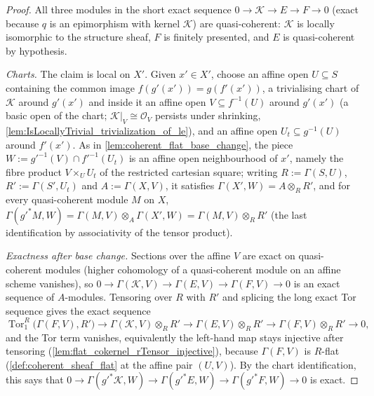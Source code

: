 \begin{proof}
  \leanok
  All three modules in the short exact sequence
  \(0 \to \mathcal K \to E \to F \to 0\) (exact because \(q\) is an
  epimorphism with kernel \(\mathcal K\)) are quasi-coherent: \(\mathcal K\)
  is locally isomorphic to the structure sheaf, \(F\) is finitely presented,
  and \(E\) is quasi-coherent by hypothesis.

  \emph{Charts.}  The claim is local on \(X'\).  Given \(x' \in X'\), choose
  an affine open \(U \subseteq S\) containing the common image
  \(f(g'(x')) = g(f'(x'))\), a trivialising chart of \(\mathcal K\) around
  \(g'(x')\) and inside it an affine open \(V \subseteq f^{-1}(U)\) around
  \(g'(x')\) (a basic open of the chart; \(\mathcal K|_V \cong \mathcal
  O_V\) persists under shrinking,
  \cref{lem:IsLocallyTrivial_trivialization_of_le}), and an affine open
  \(U_t \subseteq g^{-1}(U)\) around \(f'(x')\).  As in
  \cref{lem:coherent_flat_base_change}, the piece
  \(W := g'^{-1}(V) \cap f'^{-1}(U_t)\) is an affine open neighbourhood of
  \(x'\), namely the fibre product \(V \times_U U_t\) of the restricted
  cartesian square; writing \(R := \Gamma(S, U)\),
  \(R' := \Gamma(S', U_t)\) and \(A := \Gamma(X, V)\), it satisfies
  \(\Gamma(X', W) = A \otimes_R R'\), and for every quasi-coherent module
  \(M\) on \(X\),
  \(\Gamma(g'^* M, W) = \Gamma(M, V) \otimes_A \Gamma(X', W)
    = \Gamma(M, V) \otimes_R R'\)
  (the last identification by associativity of the tensor product).

  \emph{Exactness after base change.}  Sections over the affine \(V\) are
  exact on quasi-coherent modules (higher cohomology of a quasi-coherent
  module on an affine scheme vanishes), so
  \(0 \to \Gamma(\mathcal K, V) \to \Gamma(E, V) \to \Gamma(F, V) \to 0\)
  is an exact sequence of \(A\)-modules.  Tensoring over \(R\) with \(R'\)
  and splicing the long exact Tor sequence gives the exact sequence
  \[
    \operatorname{Tor}_1^R\bigl(\Gamma(F, V), R'\bigr)
      \to \Gamma(\mathcal K, V) \otimes_R R'
      \to \Gamma(E, V) \otimes_R R'
      \to \Gamma(F, V) \otimes_R R'
      \to 0,
  \]
  and the Tor term vanishes, equivalently the left-hand map stays injective
  after tensoring (\cref{lem:flat_cokernel_rTensor_injective}), because
  \(\Gamma(F, V)\) is \(R\)-flat (\cref{def:coherent_sheaf_flat} at the
  affine pair \((U, V)\)).  By the chart identification, this says that
  \(0 \to \Gamma(g'^* \mathcal K, W) \to \Gamma(g'^* E, W)
    \to \Gamma(g'^* F, W) \to 0\)
  is exact.


\end{proof}
